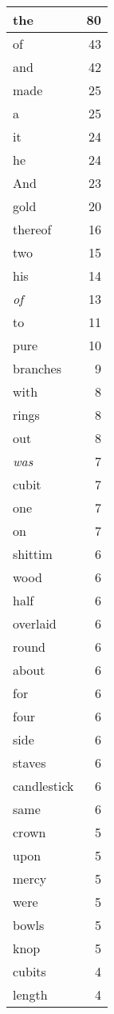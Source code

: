 \begin{center}
\begin{longtable}{l|r}
\hline \hline
\endlastfoot
the & 80 \\ \hline
of & 43 \\ \hline
and & 42 \\ \hline
made & 25 \\ \hline
a & 25 \\ \hline
it & 24 \\ \hline
he & 24 \\ \hline
And & 23 \\ \hline
gold & 20 \\ \hline
thereof & 16 \\ \hline
two & 15 \\ \hline
his & 14 \\ \hline
\emph{of} & 13 \\ \hline
to & 11 \\ \hline
pure & 10 \\ \hline
branches & 9 \\ \hline
with & 8 \\ \hline
rings & 8 \\ \hline
out & 8 \\ \hline
\emph{was} & 7 \\ \hline
cubit & 7 \\ \hline
one & 7 \\ \hline
on & 7 \\ \hline
shittim & 6 \\ \hline
wood & 6 \\ \hline
half & 6 \\ \hline
overlaid & 6 \\ \hline
round & 6 \\ \hline
about & 6 \\ \hline
for & 6 \\ \hline
four & 6 \\ \hline
side & 6 \\ \hline
staves & 6 \\ \hline
candlestick & 6 \\ \hline
same & 6 \\ \hline
crown & 5 \\ \hline
upon & 5 \\ \hline
mercy & 5 \\ \hline
were & 5 \\ \hline
bowls & 5 \\ \hline
knop & 5 \\ \hline
cubits & 4 \\ \hline
length & 4 \\ \hline

\end{longtable}
\end{center}
